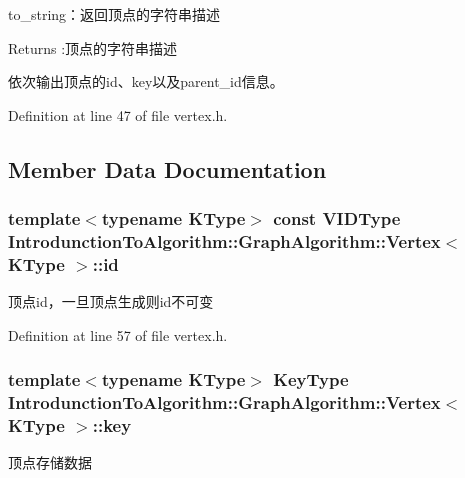 to\+\_\+string：返回顶点的字符串描述 

\begin{DoxyReturn}{Returns}
\+:顶点的字符串描述
\end{DoxyReturn}
依次输出顶点的{\ttfamily id}、{\ttfamily key}以及{\ttfamily parent\+\_\+id}信息。 

Definition at line 47 of file vertex.\+h.



\subsection{Member Data Documentation}
\hypertarget{struct_introdunction_to_algorithm_1_1_graph_algorithm_1_1_vertex_a7010bd64e704f2d210c37007d30fbfa9}{}
\subsubsection[{id}]{\setlength{\rightskip}{0pt plus 5cm}template$<$typename K\+Type$>$ const {\bf V\+I\+D\+Type} {\bf Introdunction\+To\+Algorithm\+::\+Graph\+Algorithm\+::\+Vertex}$<$ K\+Type $>$\+::id}\label{struct_introdunction_to_algorithm_1_1_graph_algorithm_1_1_vertex_a7010bd64e704f2d210c37007d30fbfa9}
顶点id，一旦顶点生成则id不可变 

Definition at line 57 of file vertex.\+h.

\hypertarget{struct_introdunction_to_algorithm_1_1_graph_algorithm_1_1_vertex_ab85342bae9a63d83eff811557c07e58e}{}
\subsubsection[{key}]{\setlength{\rightskip}{0pt plus 5cm}template$<$typename K\+Type$>$ {\bf Key\+Type} {\bf Introdunction\+To\+Algorithm\+::\+Graph\+Algorithm\+::\+Vertex}$<$ K\+Type $>$\+::key}\label{struct_introdunction_to_algorithm_1_1_graph_algorithm_1_1_vertex_ab85342bae9a63d83eff811557c07e58e}
顶点存储数据 

